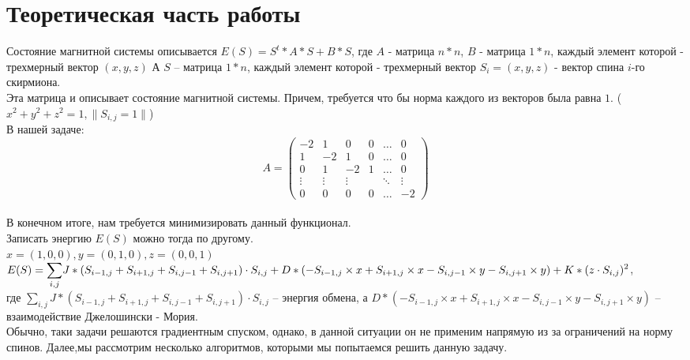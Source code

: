 \documentclass[ 12pt,x11names]{article}
\begin{document}
    \section{Теоретическая часть работы}
    Состояние магнитной системы описывается
    $E(S) = S^t*A*S + B*S$, где $A$ - матрица $n * n$, $B$ - матрица $1 * n$,
    каждый элемент которой - трехмерный вектор $(x, y, z)$
    А $S$ -- матрица $1*n$, каждый элемент которой - трехмерный вектор $S_i = (x, y, z)$ - вектор спина $i$-го скирмиона. \\
        Эта матрица и описывает состояние магнитной системы.
    Причем, требуется что бы норма каждого из векторов была равна $1$.
    ($x^2 + y ^ 2 + z ^ 2 = 1, \|S_{i, j} = 1\|$)\\
    В нашей задаче:
    \begin{equation*}
    A = \left(
    \begin{array}{ccccс}
    -2 & 1 & 0 & 0 & \ldots & 0\\
    1 & -2 & 1 & 0 &\ldots & 0\\
    0 & 1 & -2 & 1 &\ldots & 0\\
    \vdots &\vdots &\vdots &  &\ddots & \vdots\\
    0 & 0 &  0&   0 &\ldots & -2
    \end{array}
    \right)
    \end{equation*}\\
    В конечном итоге, нам требуется минимизировать данный функционал.\\
    Записать энергию $E(S)$ можно тогда по другому.\\
    $x = (1,0, 0), y = (0,1, 0), z =(0, 0 , 1)$\\
    $E(S) = \displaystyle{\sum_{i, j}} J* (S_{i - 1, j} + S_{i + 1, j} + S_{i, j - 1} + S_{i, j + 1}) \cdot S_{i,j} + \\
    D * (-S_{i - 1, j} \times x  + S_{i + 1, j} \times x - S_{i, j - 1} \times y - S_{i, j + 1} \times y)
    + \\
    K * (z \cdot S_{i,j}) ^ 2$,\\
    где
    $\displaystyle{\sum_{i, j}} J* (S_{i - 1, j} + S_{i + 1, j} + S_{i, j - 1} + S_{i, j + 1}) \cdot S_{i,j}$ -- энергия обмена, а $D * (-S_{i - 1, j} \times x  + S_{i + 1, j} \times x - S_{i, j - 1} \times y - S_{i, j + 1} \times y)$  -- взаимодействие Джелошински - Мория.\\
    Обычно, таки задачи решаются градиентным спуском, однако, в данной ситуации он не применим напрямую из за ограничений на норму спинов.
    Далее,мы рассмотрим несколько алгоритмов, которыми мы попытаемся решить данную задачу.
    \newpage
\end{document}
